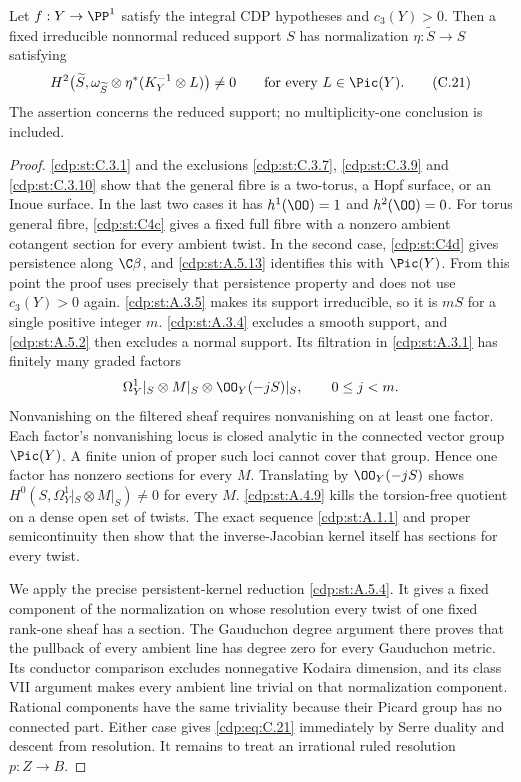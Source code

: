 
\begin{proposition}\label{cdp:st:C4e}
Let $f:Y\to\PP^1$ satisfy the integral CDP hypotheses and $c_3(Y)>0$. Then a fixed irreducible nonnormal reduced support $S$ has normalization $\eta:\widetilde S\to S$ satisfying
\[
 H^2\bigl(\widetilde S,\omega_{\widetilde S}\otimes
           \eta^*(K_Y^{-1}\otimes L)\bigr)\ne0
 \qquad\hbox{for every }L\in\Pic(Y).                  \tag{C.21}\label{cdp:eq:C.21}
\]
The assertion concerns the reduced support; no multiplicity-one conclusion is included.
\end{proposition}
\begin{proof}
\ref{cdp:st:C.3.1} and the exclusions \ref{cdp:st:C.3.7}, \ref{cdp:st:C.3.9} and \ref{cdp:st:C.3.10} show
that the general fibre is a two-torus, a Hopf surface, or
an Inoue surface. In the last two cases it has
$h^1(\OO)=1$ and $h^2(\OO)=0$.
For torus general fibre, \ref{cdp:st:C4c} gives a fixed full fibre with a nonzero ambient cotangent section for every ambient twist. In the second case, \ref{cdp:st:C4d} gives persistence along $\C\beta$, and \ref{cdp:st:A.5.13} identifies this with $\Pic(Y)$. From this point the proof uses precisely that persistence property and does not use $c_3(Y)>0$ again. \ref{cdp:st:A.3.5} makes its support irreducible, so it is $mS$ for a single positive integer $m$. \ref{cdp:st:A.3.4} excludes a smooth support, and \ref{cdp:st:A.5.2} then excludes a normal support. Its filtration in \ref{cdp:st:A.3.1} has finitely many graded factors
\[
 \Omega_Y^1|_S\otimes M|_S\otimes\OO_Y(-jS)|_S,
 \qquad 0\le j<m.
\]
Nonvanishing on the filtered sheaf requires nonvanishing on at least one factor. Each factor's nonvanishing locus is closed analytic in the connected vector group $\Pic(Y)$. A finite union of proper such loci cannot cover that group. Hence one factor has nonzero sections for every $M$. Translating by $\OO_Y(-jS)$ shows
$H^0(S,\Omega_Y^1|_S\otimes M|_S)\ne0$ for every $M$.
\ref{cdp:st:A.4.9} kills the torsion-free quotient on a dense open set of twists. The exact sequence \ref{cdp:st:A.1.1} and proper semicontinuity then show that the inverse-Jacobian kernel itself has sections for every twist.

We apply the precise persistent-kernel reduction \ref{cdp:st:A.5.4}. It gives a fixed component of the normalization on whose resolution every twist of one fixed rank-one sheaf has a section. The Gauduchon degree argument there proves that the pullback of every ambient line has degree zero for every Gauduchon metric. Its conductor comparison excludes nonnegative Kodaira dimension, and its class VII argument makes every ambient line trivial on that normalization component. Rational components have the same triviality because their Picard group has no connected part. Either case gives \eqref{cdp:eq:C.21} immediately by Serre duality and descent from resolution. It remains to treat an irrational ruled resolution $p:Z\to B$.


\end{proof}
